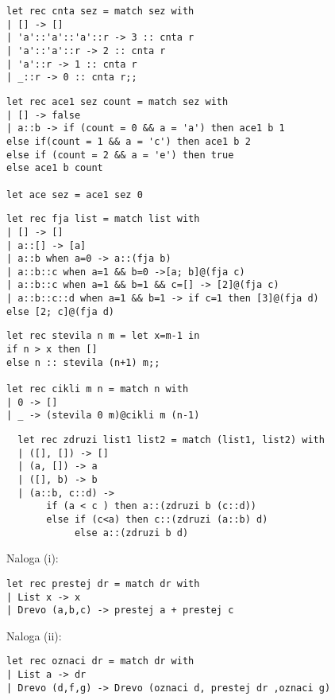 \begin{Odgovor}{2.17}
\begin{lstlisting}
let rec cnta sez = match sez with
| [] -> []
| 'a'::'a'::'a'::r -> 3 :: cnta r
| 'a'::'a'::r -> 2 :: cnta r
| 'a'::r -> 1 :: cnta r
| _::r -> 0 :: cnta r;;
\end{lstlisting}
\end{Odgovor}
\begin{Odgovor}{2.19}
\begin{lstlisting}
let rec ace1 sez count = match sez with
| [] -> false
| a::b -> if (count = 0 && a = 'a') then ace1 b 1
else if(count = 1 && a = 'c') then ace1 b 2
else if (count = 2 && a = 'e') then true
else ace1 b count

let ace sez = ace1 sez 0
\end{lstlisting}
\end{Odgovor}
\begin{Odgovor}{2.20}
\begin{lstlisting}
let rec fja list = match list with
| [] -> []
| a::[] -> [a]
| a::b when a=0 -> a::(fja b)
| a::b::c when a=1 && b=0 ->[a; b]@(fja c)
| a::b::c when a=1 && b=1 && c=[] -> [2]@(fja c)
| a::b::c::d when a=1 && b=1 -> if c=1 then [3]@(fja d)
else [2; c]@(fja d)
\end{lstlisting}
\end{Odgovor}
\begin{Odgovor}{2.21}
\begin{lstlisting}
let rec stevila n m = let x=m-1 in
if n > x then []
else n :: stevila (n+1) m;;

let rec cikli m n = match n with
| 0 -> []
| _ -> (stevila 0 m)@cikli m (n-1)
\end{lstlisting}
\end{Odgovor}
\begin{Odgovor}{2.26}
  \begin{lstlisting}
  let rec zdruzi list1 list2 = match (list1, list2) with
  | ([], []) -> []
  | (a, []) -> a
  | ([], b) -> b
  | (a::b, c::d) ->
       if (a < c ) then a::(zdruzi b (c::d))
       else if (c<a) then c::(zdruzi (a::b) d)
            else a::(zdruzi b d)
  \end{lstlisting}
  
\end{Odgovor}
\begin{Odgovor}{2.42}
Naloga (i):
\begin{lstlisting}
let rec prestej dr = match dr with
| List x -> x
| Drevo (a,b,c) -> prestej a + prestej c
\end{lstlisting}
Naloga (ii):
\begin{lstlisting}
let rec oznaci dr = match dr with
| List a -> dr
| Drevo (d,f,g) -> Drevo (oznaci d, prestej dr ,oznaci g)
\end{lstlisting}
\end{Odgovor}
